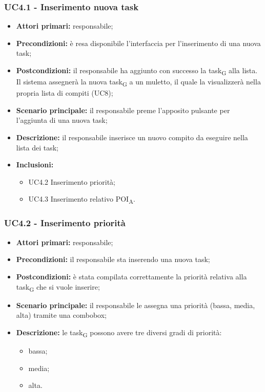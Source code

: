 \subsubsection{UC4.1 - Inserimento nuova task}

\begin{itemize}
	\item 	\textbf{Attori primari:} responsabile;
	\item 	\textbf{Precondizioni:} è resa disponibile l'interfaccia per l'inserimento di una nuova task;
	\item 	\textbf{Postcondizioni:} il responsabile ha aggiunto con successo la \gls{task}\textsubscript{G} alla lista. Il sistema assegnerà la nuova \gls{task}\textsubscript{G} a un muletto, il quale la visualizzerà nella propria lista di compiti (UC8);
	\item 	\textbf{Scenario principale:} il responsabile preme l'apposito pulsante per l'aggiunta di una nuova task; 
	\item 	\textbf{Descrizione:} il responsabile inserisce un nuovo compito da eseguire nella lista dei task;
	\item 	\textbf{Inclusioni:}
	\begin{itemize}
		\item UC4.2 Inserimento priorità;
		\item UC4.3 Inserimento relativo \acrshort{POI}\textsubscript{A}.
	\end{itemize}
\end{itemize}

\subsubsection{UC4.2 - Inserimento priorità}

\begin{itemize}
	\item 	\textbf{Attori primari:} responsabile;
	\item 	\textbf{Precondizioni:} il responsabile sta inserendo una nuova task;
	\item 	\textbf{Postcondizioni:} è stata compilata correttamente la priorità relativa alla \gls{task}\textsubscript{G} che si vuole inserire;
	\item 	\textbf{Scenario principale:} il responsabile le assegna una priorità (bassa, media, alta) tramite una combobox;
	\item 	\textbf{Descrizione:} le \gls{task}\textsubscript{G} possono avere tre diversi gradi di priorità:
	\begin{itemize}
		\item bassa;
		\item media;
		\item alta.
	\end{itemize}
\end{itemize}

